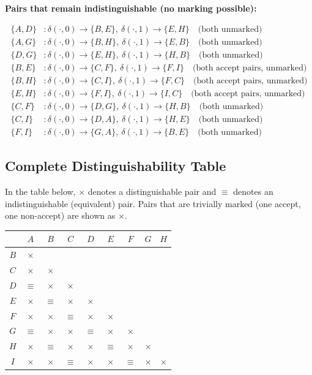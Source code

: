 \documentclass{article}
\theoremstyle{theorem}
\theoremstyle{definition}
\theoremstyle{remark}
\begin{document}
\medskip
\noindent\textbf{Pairs that remain indistinguishable (no marking possible):}

\begin{align*}
\{A,D\} &: \delta(\cdot,0)\to\{B,E\},\ \delta(\cdot,1)\to\{E,H\} \quad \text{(both unmarked)} \\
\{A,G\} &: \delta(\cdot,0)\to\{B,H\},\ \delta(\cdot,1)\to\{E,B\} \quad \text{(both unmarked)} \\
\{D,G\} &: \delta(\cdot,0)\to\{E,H\},\ \delta(\cdot,1)\to\{H,B\} \quad \text{(both unmarked)} \\
\{B,E\} &: \delta(\cdot,0)\to\{C,F\},\ \delta(\cdot,1)\to\{F,I\} \quad \text{(both accept pairs, unmarked)} \\
\{B,H\} &: \delta(\cdot,0)\to\{C,I\},\ \delta(\cdot,1)\to\{F,C\} \quad \text{(both accept pairs, unmarked)} \\
\{E,H\} &: \delta(\cdot,0)\to\{F,I\},\ \delta(\cdot,1)\to\{I,C\} \quad \text{(both accept pairs, unmarked)} \\
\{C,F\} &: \delta(\cdot,0)\to\{D,G\},\ \delta(\cdot,1)\to\{H,B\} \quad \text{(both unmarked)} \\
\{C,I\} &: \delta(\cdot,0)\to\{D,A\},\ \delta(\cdot,1)\to\{H,E\} \quad \text{(both unmarked)} \\
\{F,I\} &: \delta(\cdot,0)\to\{G,A\},\ \delta(\cdot,1)\to\{B,E\} \quad \text{(both unmarked)}
\end{align*}

\subsection*{Complete Distinguishability Table}

In the table below, $\times$ denotes a distinguishable pair and $\equiv$ denotes an indistinguishable (equivalent) pair. Pairs that are trivially marked (one accept, one non-accept) are shown as $\times$.

\begin{center}
\renewcommand{\arraystretch}{1.4}
\begin{tabular}{c|cccccccc}
  & $A$ & $B$ & $C$ & $D$ & $E$ & $F$ & $G$ & $H$ \\
\hline
$B$ & $\times$ & & & & & & & \\
$C$ & $\times$ & $\times$ & & & & & & \\
$D$ & $\equiv$ & $\times$ & $\times$ & & & & & \\
$E$ & $\times$ & $\equiv$ & $\times$ & $\times$ & & & & \\
$F$ & $\times$ & $\times$ & $\equiv$ & $\times$ & $\times$ & & & \\
$G$ & $\equiv$ & $\times$ & $\times$ & $\equiv$ & $\times$ & $\times$ & & \\
$H$ & $\times$ & $\equiv$ & $\times$ & $\times$ & $\equiv$ & $\times$ & $\times$ & \\
$I$ & $\times$ & $\times$ & $\equiv$ & $\times$ & $\times$ & $\equiv$ & $\times$ & $\times$ \\
\end{tabular}
\end{center}
\end{document}
